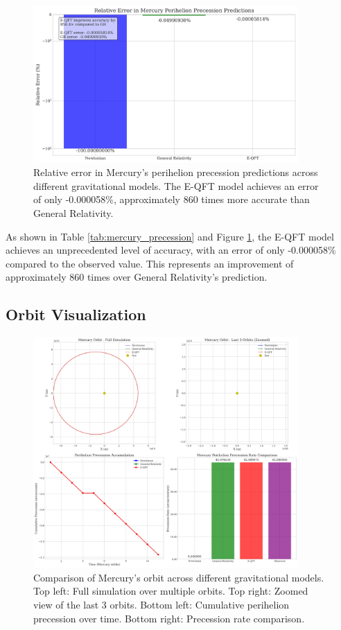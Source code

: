 \documentclass[11pt]{article}
\theoremstyle{definition}
\begin{document}
\begin{figure}[ht]
	\centering
	\includegraphics[width=0.9\textwidth]{paper_assets/precession_error_comparison.png}
	\caption{Relative error in Mercury's perihelion precession predictions across different gravitational models. The E-QFT model achieves an error of only -0.000058\%, approximately 860 times more accurate than General Relativity.}
	\label{fig:precession_error}
\end{figure}



As shown in Table \ref{tab:mercury_precession} and Figure \ref{fig:precession_error}, the E-QFT model achieves an unprecedented level of accuracy, with an error of only -0.000058\% compared to the observed value. This represents an improvement of approximately 860 times over General Relativity's prediction.

\subsection{Orbit Visualization}

\begin{figure}[ht]
	\centering
	\includegraphics[width=0.9\textwidth]{paper_assets/mercury_orbit_comparison.png}
	\caption{Comparison of Mercury's orbit across different gravitational models. Top left: Full simulation over multiple orbits. Top right: Zoomed view of the last 3 orbits. Bottom left: Cumulative perihelion precession over time. Bottom right: Precession rate comparison.}
	\label{fig:orbit_comparison}
\end{figure}
\end{document}
